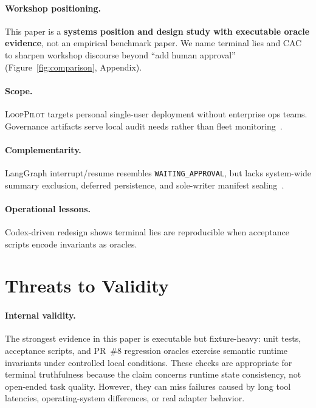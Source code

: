 \documentclass[11pt]{article}
\newcommand{\looppilot}{\textsc{LoopPilot}}
\newcommand{\cac}{\textsc{CAC}}
\begin{document}
\paragraph{Workshop positioning.}
This paper is a \textbf{systems position and design study with executable oracle evidence}, not an empirical benchmark paper.
We name terminal lies and \cac{} to sharpen workshop discourse beyond ``add human approval'' (Figure~\ref{fig:comparison}, Appendix).

\paragraph{Scope.}
\looppilot{} targets personal single-user deployment without enterprise ops teams.
Governance artifacts serve local audit needs rather than fleet monitoring~\cite{mlflow2024,opentelemetry2024}.

\paragraph{Complementarity.}
LangGraph interrupt/resume resembles \texttt{WAITING\_APPROVAL}, but lacks system-wide summary exclusion, deferred persistence, and sole-writer manifest sealing~\cite{langgraph2024}.

\paragraph{Operational lessons.}
Codex-driven redesign shows terminal lies are reproducible when acceptance scripts encode invariants as oracles.

\section{Threats to Validity}
\label{sec:threats}

\paragraph{Internal validity.}
The strongest evidence in this paper is executable but fixture-heavy: unit tests, acceptance scripts, and PR~\#8 regression oracles exercise semantic runtime invariants under controlled local conditions.
These checks are appropriate for terminal truthfulness because the claim concerns runtime state consistency, not open-ended task quality.
However, they can miss failures caused by long tool latencies, operating-system differences, or real adapter behavior.
\end{document}
